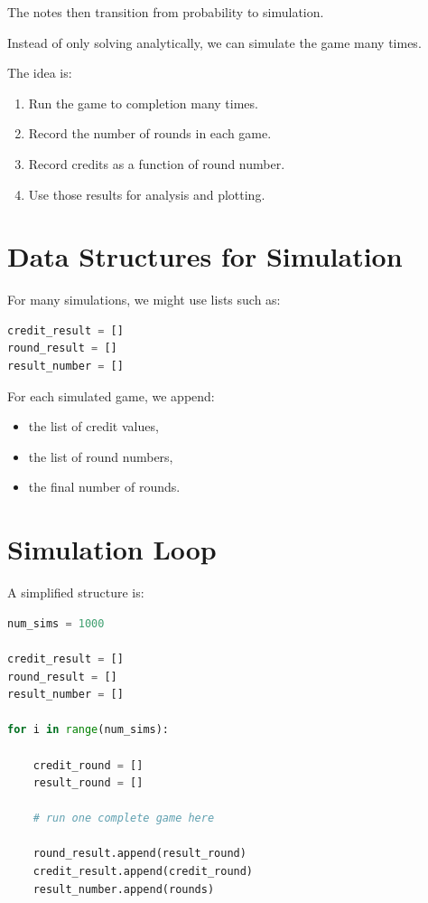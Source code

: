 \documentclass[11pt]{article}
\begin{document}
The notes then transition from probability to simulation.

Instead of only solving analytically, we can simulate the game many times.

The idea is:

\begin{enumerate}
    \item Run the game to completion many times.
    \item Record the number of rounds in each game.
    \item Record credits as a function of round number.
    \item Use those results for analysis and plotting.
\end{enumerate}

\section{Data Structures for Simulation}

For many simulations, we might use lists such as:

\begin{lstlisting}[language=Python]
credit_result = []
round_result = []
result_number = []
\end{lstlisting}

For each simulated game, we append:

\begin{itemize}
    \item the list of credit values,
    \item the list of round numbers,
    \item the final number of rounds.
\end{itemize}

\section{Simulation Loop}

A simplified structure is:

\begin{lstlisting}[language=Python]
num_sims = 1000

credit_result = []
round_result = []
result_number = []

for i in range(num_sims):

    credit_round = []
    result_round = []

    # run one complete game here

    round_result.append(result_round)
    credit_result.append(credit_round)
    result_number.append(rounds)
\end{lstlisting}
\end{document}
